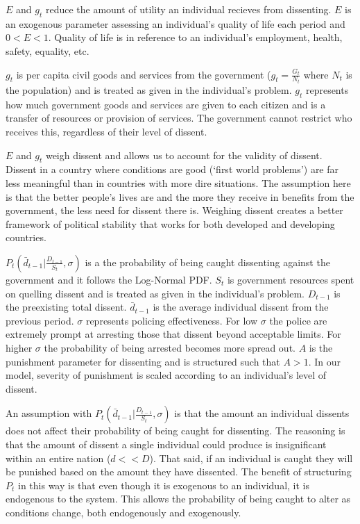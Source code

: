 \documentclass[12pt]{article}
\begin{document}
\begin{spacing}{1.5}
$E$ and $g_t$ reduce the amount of utility an individual recieves from dissenting. $E$ is an exogenous parameter assessing an individual's quality of life each period and $0<E<1$. Quality of life is in reference to an individual's employment, health, safety, equality, etc.

$g_t$ is per capita civil goods and services from the government ($g_t=\frac{G_t}{N_t}$ where $N_t$ is the population) and is treated as given in the individual's problem. $g_t$ represents how much  government goods and services are given to each citizen and is a transfer of resources or provision of services. The government cannot restrict who receives this, regardless of their level of dissent.
 
$E$ and $g_t$ weigh dissent and allows us to account for the validity of dissent. Dissent in a country where conditions are good (`first world problems') are far less meaningful than in countries with more dire situations. The assumption here is that the better people's lives are and the more they receive in benefits from the government, the less need for dissent there is. Weighing dissent creates a better framework of political stability that works for both developed and developing countries.

$ P_t \left( \bar{d}_{t-1} \Bigg|\frac{D_{t-1}}{S_t},\sigma \right)$ is a the probability of being caught dissenting against the government and it follows the Log-Normal PDF. $S_t$ is government resources spent on quelling dissent and is treated as given in the individual's problem. $D_{t-1}$ is the preexisting total dissent. $\bar{d}_{t-1}$ is the average individual dissent from the previous period. $\sigma$ represents policing effectiveness. For low $\sigma$ the police are extremely prompt at arresting those that dissent beyond acceptable limits. For higher $\sigma$ the probability of being arrested becomes more spread out. $A$ is the punishment parameter for dissenting and is structured such that $A>1$. In our model, severity of punishment is scaled according to an individual's level of dissent. 

An assumption with $P_t \left( \bar{d}_{t-1} \Bigg|\frac{D_{t-1}}{S_t},\sigma \right)$ is that the amount an individual dissents does not affect their probability of being caught for dissenting. The reasoning is that the amount of dissent a single individual could produce is insignificant within an entire nation ($d<<D$). That said, if an individual is caught they will be punished based on the amount they have dissented. The benefit of structuring $P_t$ in this way is that even though it is exogenous to an individual, it is endogenous to the system. This allows the probability of being caught to alter as conditions change, both endogenously and exogenously.    


\end{spacing}
\end{document}
